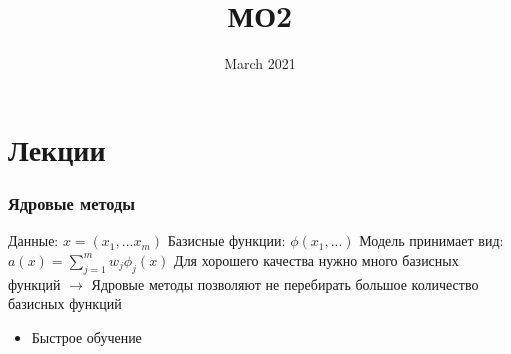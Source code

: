 \documentclass[a4paper, 12pt]{article}
\title{МО2}
\date{March 2021}
\begin{document}
\maketitle

\part{Лекции}

\section{Ядровые методы}

Данные: $x = (x_{1}, ... x_{m})$
\newline
Базисные функции: $\phi(x_{1}, ...)$
\newline
Модель принимает вид: $a(x) = \sum_{j = 1}^{m}w_{j}\phi_{j}(x)$
\newline
Для хорошего качества нужно много базисных функций $\rightarrow$ Ядровые методы позволяют не перебирать большое количество базисных функций

\begin{itemize}
    \item Быстрое обучение
\end{itemize}
\end{document}
